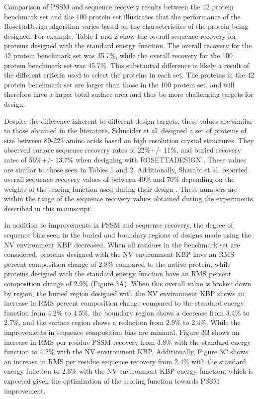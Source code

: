 Comparison of PSSM and sequence recovery results between the 42 protein benchmark set and the 100 protein set illustrates that the performance of the RosettaDesign algorithm varies based on the characteristics of the protein being designed.
For example, Table 1 and 2 show the overall sequence recovery for proteins designed with the standard energy function.
The overall recovery for the 42 protein benchmark set was 35.7\%, while the overall recovery for the 100 protein benchmark set was 45.7\%.
This substantial difference is likely a result of the different criteria used to select the proteins in each set.
The proteins in the 42 protein benchmark set are larger than those in the 100 protein set, and will therefore have a larger total surface area and thus be more challenging targets for design.

Despite the difference inherent to different design targets, these values are similar to those obtained in the literature.
Schneider et al. designed a set of proteins of size between 89-223 amino acids based on high resolution crystal structures.
They observed surface sequence recovery rates of 22\%+/- 11\%, and buried recovery rates of 56\%+/- 13.7\% when designing with ROSETTADESIGN \citep{Schneider:2009ig}.
These values are similar to those seen in Tables 1 and 2.
Additionally, Sharabi et al. reported overall sequence recovery values of between 40\% and 70\% depending on the weights of the scoring function used during their design \citep{Sharabi:2011ev}.
These numbers are within the range of the sequence recovery values obtained during the experiments described in this manuscript.

In addition to improvements in PSSM and sequence recovery, the degree of sequence bias seen in the buried and boundary regions of designs made using the NV environment KBP decreased.
When all residues in the benchmark set are considered, proteins designed with the NV environment KBP have an RMS percent composition change of 2.8\% compared to the native protein, while proteins designed with the standard energy function have an RMS percent composition change of 2.9\% (Figure 3A).
When this overall value is broken down by region, the buried region designed with the NV environment KBP shows an increase in RMS percent composition change compared to the standard energy function from 4.2\% to 4.5\%, the boundary region shows a decrease from 3.4\% to 2.7\%, and the surface region shows a reduction from 2.9\% to 2.4\%.
While the improvements in sequence composition bias are minimal, Figure 3B shows an increase in RMS per residue PSSM recovery from 3.8\% with the standard energy function to 4.2\% with the NV environment KBP.
Additionally, Figure 3C shows an increase in RMS per residue sequence recovery from 2.4\% with the standard energy function to 2.6\% with the NV environment KBP energy function, which is expected given the optimization of the scoring function towards PSSM improvement. 
 
